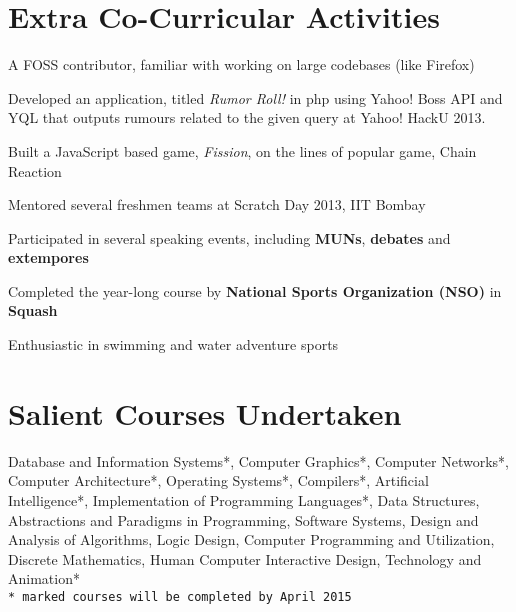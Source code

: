 \documentclass[margin,11pt]{resume}
\begin{document}
\begin{resume}
\section{\mysidestyle Extra Co-Curricular Activities}
\begin{list2}
\item A FOSS contributor, familiar with working on large codebases (like Firefox)
\item Developed an application, titled \textsl{Rumor Roll!} in php using Yahoo! Boss API and YQL that outputs rumours related to the given query at Yahoo! HackU 2013.
\item Built a JavaScript based game, \textsl{Fission}, on the lines of popular game, Chain Reaction
\item Mentored several freshmen teams at Scratch Day 2013, IIT Bombay
\item Participated in several speaking events, including \textbf{MUNs}, \textbf{debates} and \textbf{extempores}
\item Completed the year-long course by \textbf{National Sports Organization (NSO)} in \textbf{Squash}
\item Enthusiastic in swimming and water adventure sports
\end{list2}


    \section{\mysidestyle Salient Courses Undertaken} 

Database and Information Systems*, Computer Graphics*, Computer Networks*, Computer Architecture*, Operating Systems*, Compilers*, Artificial Intelligence*, Implementation of Programming Languages*,  Data Structures, Abstractions and Paradigms in Programming, Software Systems, Design and Analysis of Algorithms, Logic Design, Computer Programming and Utilization, Discrete Mathematics, Human Computer Interactive Design, Technology and Animation* \\
\texttt{* marked courses will be completed by April 2015}\\


\end{resume}
\end{document}
